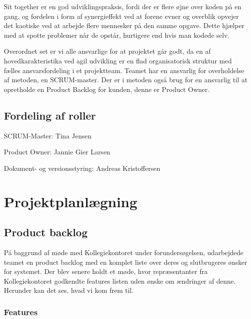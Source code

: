 \documentclass[12pt, a4paper]{report}
\begin{document}
Sit together er en god udviklingspraksis, fordi der er flere øjne over koden på en gang, og fordelen i form af synergieffekt ved at forene evner og overblik opvejer det kaotiske ved at arbejde flere mennesker på den samme opgave. Dette hjælper med at spotte problemer når de opstår, hurtigere end hvis man kodede selv.

Overordnet set er vi alle ansvarlige for at projektet går godt, da en af hovedkarakteristika ved agil udvikling er en flad organisatorisk struktur med fælles ansvarsfordeling i et projektteam. Teamet har en ansvarlig for overholdelse af metoden, en SCRUM-master. Der er i metoden også brug for en ansvarlig til at opretholde en Product Backlog for kunden, denne er Product Owner.

\subsection{Fordeling af roller}

SCRUM-Master: Tina Jensen \newline

Product Owner: Jannie Gier Larsen \newline

Dokument- og versionsstyring: Andreas Kristoffersen \newline


\section{Projektplanlægning}

\subsection{Product backlog}

På baggrund af møde med Kollegiekontoret under forundersøgelsen, udarbejdede teamet en product backlog med en komplet liste over deres og slutbrugeres ønsker for systemet. Der blev senere holdt et møde, hvor repræsentanter fra Kollegiekontoret godkendte features listen uden ønske om ændringer af denne. Herunder kan det ses, hvad vi kom frem til.

\subsubsection{Features}
\end{document}
